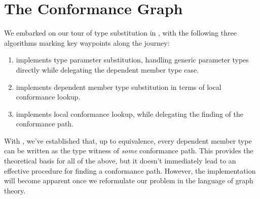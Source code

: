 \documentclass[../generics]{subfiles}
\begin{document}
\section{The Conformance Graph}\label{finding conformance paths}

We embarked on our tour of type substitution in , with the following three algorithms marking key waypoints along the journey:
\begin{enumerate}
\item {} implements type parameter substitution, handling generic parameter types directly while delegating the dependent member type case.
\item {} implements dependent member type substitution in terms of local conformance lookup.
\item {} implements local conformance lookup, while delegating the finding of the conformance path.
\end{enumerate}
With , we've established that, up to equivalence, every dependent member type can be written as the type witness of \emph{some} conformance path. This provides the theoretical basis for all of the above, but it doesn't immediately lead to an effective procedure for finding a conformance path. However, the implementation will become apparent once we reformulate our problem in the language of graph theory.
\end{document}
